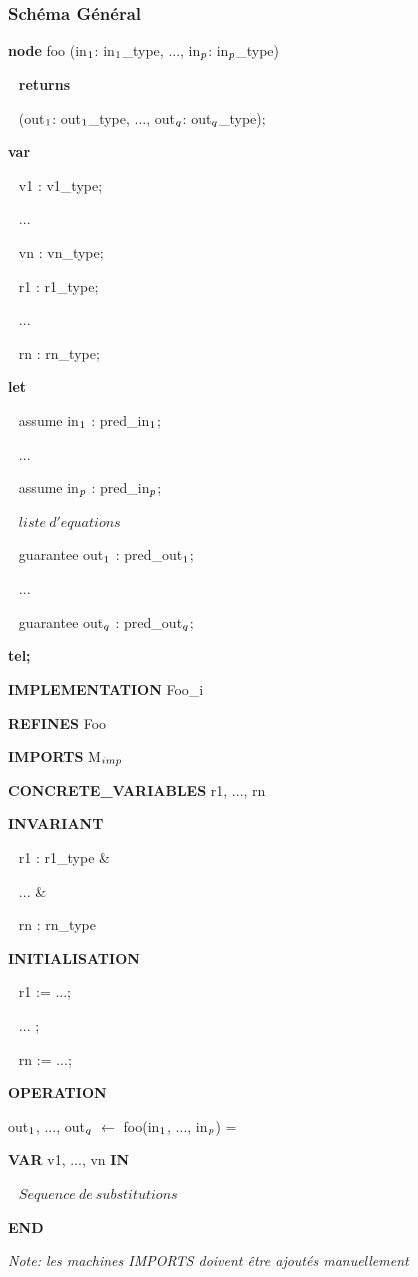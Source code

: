 \documentclass[10pt]{beamer}
\begin{document}
\begin{frame}
  \frametitle{Schéma Général}

\begin{scriptsize}
\setlength{\columnseprule}{0.05cm}
\begin{multicols}{2}
\begin{semiverbatim}
\textbf{node} foo (in$\sb{1}$: in$\sb{1}$\_type, ..., in$\sb{p}$: in$\sb{p}$\_type) 

$~~$  \textbf{returns}

$~~$  (out$\sb{1}$: out$\sb{1}$\_type, ..., out$\sb{q}$: out$\sb{q}$\_type);

\textbf{var}

$~~$  v1 : v1\_type;

$~~$  ...

$~~$  vn : vn\_type;

$~~$  r1 : r1\_type;

$~~$  ...

$~~$  rn : rn\_type;

\textbf{let}

$~~$  assume in$\sb{1}$ : pred\_in$\sb{1}$;

$~~$  ...

$~~$  assume in$\sb{p}$ : pred\_in$\sb{p}$;


$~~$  $liste ~d'equations$


$~~$  guarantee out$\sb{1}$ : pred\_out$\sb{1}$;

$~~$  ...

$~~$  guarantee out$\sb{q}$ : pred\_out$\sb{q}$;

\textbf{tel;}

\end{semiverbatim}

\columnbreak

\begin{semiverbatim}
\textbf{IMPLEMENTATION} Foo\_i

\textbf{REFINES} Foo

\textbf{IMPORTS} M$\sb{imp}$


\textbf{CONCRETE\_VARIABLES} r1, ..., rn

\textbf{INVARIANT}

$~~$  r1 : r1\_type \&

$~~$  ... \&

$~~$  rn : rn\_type

\textbf{INITIALISATION}

$~~$  r1 := ...;

$~~$  ... ;

$~~$  rn := ...;


\textbf{OPERATION}

out$\sb{1}$, ..., out$\sb{q}$ $\leftarrow$ foo(in$\sb{1}$, ..., in$\sb{p}$) =
  
\textbf{VAR} v1, ..., vn \textbf{IN}
  

$~~$  $Sequence~ de~ substitutions$


\textbf{END}
\end{semiverbatim}
\end{multicols}
\end{scriptsize}

\pause[2]
\emph{Note: les machines IMPORTS doivent être ajoutés manuellement}
\end{frame}
\end{document}

